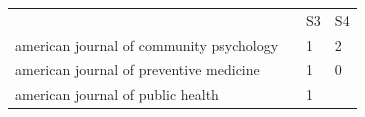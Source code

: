\documentclass[]{tufte-handout}
\begin{document}
\begin{longtable}[]{@{}llll@{}}
\toprule
\begin{minipage}[t]{0.63\columnwidth}\raggedright\strut
\strut
\end{minipage} & \begin{minipage}[t]{0.04\columnwidth}\raggedright\strut
\strut
\end{minipage} & \begin{minipage}[t]{0.06\columnwidth}\raggedright\strut
S3\strut
\end{minipage} & \begin{minipage}[t]{0.06\columnwidth}\raggedright\strut
S4\strut
\end{minipage}\tabularnewline
\begin{minipage}[t]{0.63\columnwidth}\raggedright\strut
american journal of community psychology\strut
\end{minipage} & \begin{minipage}[t]{0.04\columnwidth}\raggedright\strut
\strut
\end{minipage} & \begin{minipage}[t]{0.06\columnwidth}\raggedright\strut
1\strut
\end{minipage} & \begin{minipage}[t]{0.06\columnwidth}\raggedright\strut
2\strut
\end{minipage}\tabularnewline
\begin{minipage}[t]{0.63\columnwidth}\raggedright\strut
american journal of preventive medicine\strut
\end{minipage} & \begin{minipage}[t]{0.04\columnwidth}\raggedright\strut
\strut
\end{minipage} & \begin{minipage}[t]{0.06\columnwidth}\raggedright\strut
1\strut
\end{minipage} & \begin{minipage}[t]{0.06\columnwidth}\raggedright\strut
0\strut
\end{minipage}\tabularnewline
\begin{minipage}[t]{0.63\columnwidth}\raggedright\strut
american journal of public health\strut
\end{minipage} & \begin{minipage}[t]{0.04\columnwidth}\raggedright\strut
\strut
\end{minipage} & \begin{minipage}[t]{0.06\columnwidth}\raggedright\strut
1\strut
\end{minipage} & \begin{minipage}[t]{0.06\columnwidth}\raggedright\strut

\end{minipage}
\end{longtable}
\end{document}
